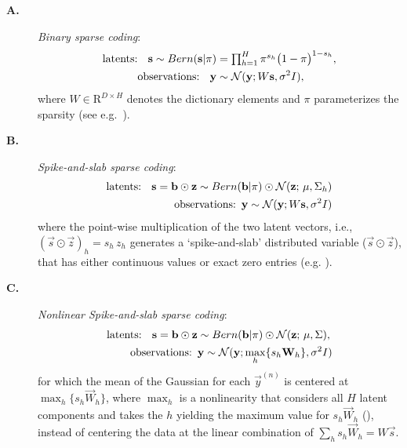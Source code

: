 \begin{description}
\item[\textbf{A.}] \textit{Binary sparse coding}:
%
\vspace{-.1cm}
\begin{align}
\text{latents: } \,\,\,\vec{s} \sim Bern(\vec{s} | \pi) &= \disT\prod_{h=1}^H \pi^{s_h} \big( 1 - \pi \big)^{1-s_h},\nonumber \\
\text{observations:  }\,\,\,    \vec{y} &\sim \mathcal{N}(\vec{y}; W\vec{s}, \sigma^2\One),\nonumber%
\end{align}
%
where $W \in \mathrm{R}^{D \times H}$ denotes the dictionary elements and $\pi$ parameterizes the sparsity (see e.g.~\citep{HennigesEtAl2010}).
\item[\textbf{B.}] \textit{Spike-and-slab sparse coding}:
\vspace{-.2cm}
\begin{align}
\text{latents: } \,\,\,\vec{s} = \vec{b}\odot\vec{z} \sim Bern(\vec{b} | \pi) \odot \mathcal{N}(\vec{z};\,\vec{\mu} , \Sigma_h)\nonumber\\
\text{observations:}  \,\,\, \vec{y} \sim \mathcal{N}(\vec{y}; W\vec{s}, \sigma^2\One)\nonumber%
\end{align}
where the point-wise multiplication of the two latent vectors, i.e., $(\vec{s}\odot\vec{z})_h = s_h\,z_h$
generates a `spike-and-slab' distributed variable ($\vec{s}\odot\vec{z}$), that has either continuous values or exact zero entries (e.g. \citep{TitsiasGredilla2011,GoodfellowEtAl2013,SheikhEtAl2014}).
%
\item[\textbf{C.}] \textit{Nonlinear Spike-and-slab sparse coding}:
\vspace{-.2cm}
\begin{align}\label{eq:ssmca}
\text{latents: } \,\,\,{\mathbf{s}} = {\mathbf{b}}\odot{\mathbf{z}} &\sim Bern({\mathbf{b}} | \pi) \odot \mathcal{N}({\mathbf{z}};\,{\mathbf{\mu}} , \Sigma), \nonumber\\
 \text{observations:}\,\,\, &{\mathbf{y}} \sim \mathcal{N}({\mathbf{y}}; \max_{h}\{s_h{\mathbf{W}}_{h}\}, \sigma^2I)\nonumber
\end{align}
for which the mean of the Gaussian for each $\vec{y}^{(n)}$ is centered at $\max_{h}\{s_h\vec{W}_{h}\}$, where $\max_{h}$ is a nonlinearity that considers all $H$ latent components and takes the $h$ yielding the maximum value for $s_h\vec{W}_{h}$ (\citep{LuckeSahani2008,SheltonEtAl2012,BornscheinEtAl2013}), instead of centering the data at the linear combination of $\sum_h s_h\vec{W}_h=W\vec{s}$.
%
\end{description}

